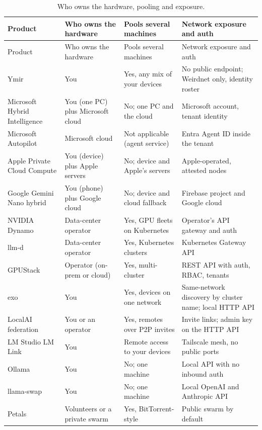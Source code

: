 {\small
\begin{xltabular}{\linewidth}{@{}L{3.3cm}L{3.2cm}YY@{}}
\caption{Who owns the hardware, pooling and exposure.}\\
\toprule
Product & Who owns the hardware & Pools several machines & Network exposure and auth \\
\midrule
\endfirsthead
\toprule
Product & Who owns the hardware & Pools several machines & Network exposure and auth \\
\midrule
\endhead
Ymir & You & Yes, any mix of your devices & No public endpoint; Weirdnet only, identity roster \\
Microsoft Hybrid Intelligence & You (one PC) plus Microsoft cloud & No; one PC and the cloud & Microsoft account, tenant identity \\
Microsoft Autopilot & Microsoft cloud & Not applicable (agent service) & Entra Agent ID inside the tenant \\
Apple Private Cloud Compute & You (device) plus Apple servers & No; device and Apple's servers & Apple-operated, attested nodes \\
Google Gemini Nano hybrid & You (phone) plus Google cloud & No; device and cloud fallback & Firebase project and Google cloud \\
NVIDIA Dynamo & Data-center operator & Yes, GPU fleets on Kubernetes & Operator's API gateway and auth \\
llm-d & Data-center operator & Yes, Kubernetes clusters & Kubernetes Gateway API \\
GPUStack & Operator (on-prem or cloud) & Yes, multi-cluster & REST API with auth, RBAC, tenants \\
exo & You & Yes, devices on one network & Same-network discovery by cluster name; local HTTP API \\
LocalAI federation & You or an operator & Yes, remotes over P2P invites & Invite links; admin key on the HTTP API \\
LM Studio LM Link & You & Remote access to your devices & Tailscale mesh, no public ports \\
Ollama & You & No; one machine & Local API with no inbound auth \\
llama-swap & You & No; one machine & Local OpenAI and Anthropic API \\
Petals & Volunteers or a private swarm & Yes, BitTorrent-style & Public swarm by default \\
\bottomrule
\end{xltabular}

}
